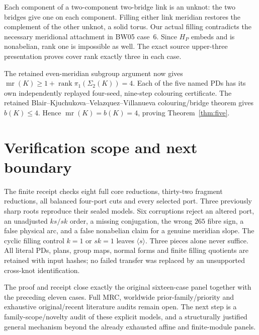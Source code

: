 \documentclass[11pt]{article}
\newcommand{\rank}{\operatorname{rank}}
\newcommand{\mr}{\operatorname{mr}}
\begin{document}
Each component of a two-component two-bridge link is an unknot: the two
bridges give one on each component. Filling either link meridian
restores the complement of the other unknot, a solid torus. Our actual
filling contradicts the necessary meridional attachment in BW05 case~6.
Since $H_P$ embeds and is nonabelian, rank one is impossible as well.
The exact source upper-three presentation proves cover rank exactly
three in each case.

The retained even-meridian subgroup argument now gives
$\mr(K)\ge1+\rank\pi_1(\Sigma_2(K))=4$.
Each of the five named PDs has its own independently replayed four-seed,
nine-step colouring certificate. The retained
Blair--Kjuchukova--Velazquez--Villanueva colouring/bridge theorem gives
$b(K)\le4$. Hence $\mr(K)=b(K)=4$, proving Theorem~\ref{thm:five}.

\section{Verification scope and next boundary}

The finite receipt checks eight full core reductions, thirty-two fragment
reductions, all balanced four-port cuts and every selected port. Three
previously sharp roots reproduce their sealed models. Six corruptions
reject an altered port, an unadjusted $ks/sk$ order, a missing conjugation,
the wrong $265$ fibre sign, a false physical arc, and a false nonabelian
claim for a genuine meridian slope. The cyclic filling control $k=1$ or
$sk=1$ leaves $\langle s\rangle$. Three pieces alone never suffice.
All literal PDs, plans, group maps, normal forms and finite filling
quotients are retained with input hashes; no failed transfer was replaced
by an unsupported cross-knot identification.

The proof and receipt close exactly the original sixteen-case panel
together with the preceding eleven cases. Full MRC, worldwide
prior-family/priority and exhaustive original/recent literature audits
remain open. The next step is a family-scope/novelty audit of these
explicit models, and a structurally justified general mechanism beyond
the already exhausted affine and finite-module panels.
\end{document}
